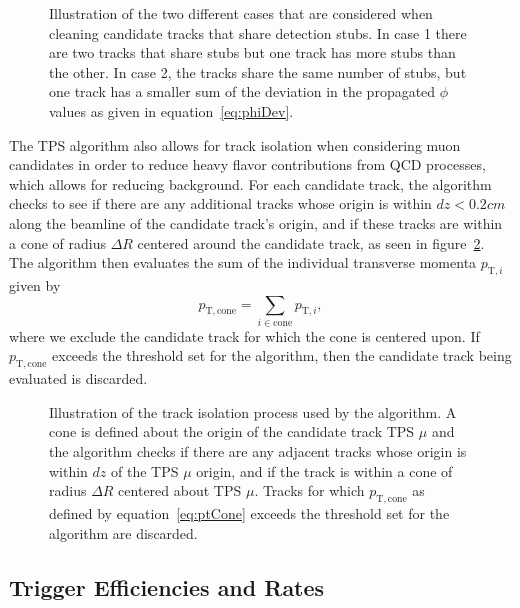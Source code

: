\begin{figure}[htbp]
  \centering
  
  \caption{
    Illustration of the two different cases that are considered when cleaning candidate tracks that share detection stubs.
    In case 1 there are two tracks that share stubs but one track has more stubs than the other.
    In case 2, the tracks share the same number of stubs, but one track has a smaller sum of the deviation in the propagated $\phi$ values as given in equation~\ref{eq:phiDev}.
  }
  \label{fig:clean}
\end{figure}

The TPS algorithm also allows for track isolation when considering muon candidates in order to reduce heavy flavor contributions from QCD processes, which allows for reducing background.
For each candidate track, the algorithm checks to see if there are any additional tracks whose origin is within $dz<0.2\unit{cm}$ along the beamline of the candidate track's origin, and if these tracks are within a cone of radius $\Delta R$ centered around the candidate track, as seen in figure~\ref{fig:isol}.
The algorithm then evaluates the sum of the individual transverse momenta $p_{\mathrm{T},i}$ given by
\begin{equation}\label{eq:ptCone}
  p_\mathrm{T,cone}=\sum_{i\in\mathrm{cone}}p_{\mathrm{T},i},
\end{equation}
where we exclude the candidate track for which the cone is centered upon.
If $p_\mathrm{T,cone}$ exceeds the threshold set for the algorithm, then the candidate track being evaluated is discarded.

\begin{figure}[htbp]
  \centering
  
  \caption{
    Illustration of the track isolation process used by the algorithm.
    A cone is defined about the origin of the candidate track TPS $\mu$ and the algorithm checks if there are any adjacent tracks whose origin is within $dz$ of the TPS $\mu$ origin, and if the track is within a cone of radius $\Delta R$ centered about TPS $\mu$.
    Tracks for which $p_\mathrm{T,cone}$ as defined by equation~\ref{eq:ptCone} exceeds the threshold set for the algorithm are discarded.
  }
  \label{fig:isol}
\end{figure}

\subsection{Trigger Efficiencies and Rates}
\label{subsec:effRates}

